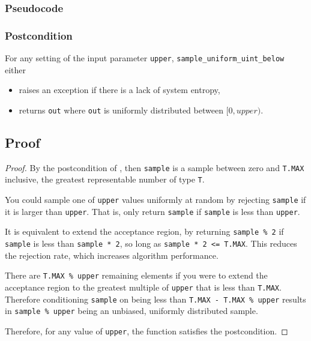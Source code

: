 \documentclass{article}
\begin{document}
\subsubsection*{Pseudocode}



\subsubsection*{Postcondition}
For any setting of the input parameter \texttt{upper},
\texttt{sample\_uniform\_uint\_below} either
\begin{itemize}
    \item raises an exception if there is a lack of system entropy,
    \item returns \texttt{out} where \texttt{out} is uniformly distributed between $[0, upper)$.
\end{itemize}

\subsection{Proof}
\begin{proof}
\label{unsigned-integer-proof}
By the postcondition of ,
then \texttt{sample} is a sample between zero and \texttt{T.MAX} inclusive, the greatest representable number of type \texttt{T}.

You could sample one of \texttt{upper} values uniformly at random by rejecting \texttt{sample} if it is larger than \texttt{upper}.
That is, only return \texttt{sample} if \texttt{sample} is less than \texttt{upper}.

It is equivalent to extend the acceptance region,
by returning \texttt{sample \% 2} if \texttt{sample} is less than \texttt{sample * 2},
so long as \texttt{sample * 2 <= T.MAX}.
This reduces the rejection rate, which increases algorithm performance.

There are \texttt{T.MAX \% upper} remaining elements if you were to
extend the acceptance region to the greatest multiple of \texttt{upper} that is less than \texttt{T.MAX}.
Therefore conditioning \texttt{sample} on being less than \texttt{T.MAX - T.MAX \% upper}
results in \texttt{sample \% upper} being an unbiased, uniformly distributed sample.

\noindent Therefore, for any value of \texttt{upper}, the function satisfies the postcondition.
\end{proof}
\end{document}
